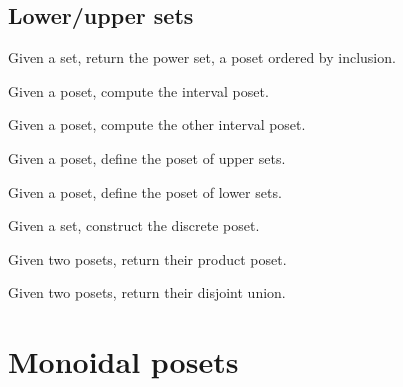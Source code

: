 \subsection{Lower/upper sets}
\begin{exercise}
  Given a set, return the power set, a poset ordered by inclusion.

\end{exercise}


\begin{exercise}
  Given a poset, compute the interval poset.

\end{exercise}


\begin{exercise}
  Given a poset, compute the other interval poset.

\end{exercise}


\begin{exercise}
  Given a poset, define the poset of upper sets.

\end{exercise}

\begin{exercise}
  Given a poset, define the poset of lower sets.
\end{exercise}


\begin{exercise}
  Given a set, construct the discrete poset.

\end{exercise}


\begin{exercise}
  Given two posets, return their product poset.
\end{exercise}
\begin{exercise}
  Given two posets, return their disjoint union.

\end{exercise}


\section{Monoidal posets}


